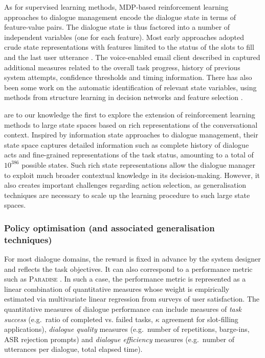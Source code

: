 As for supervised learning methods, MDP-based reinforcement learning approaches to dialogue management encode the dialogue state in terms of feature-value pairs.  The dialogue state is thus factored into a number of independent variables (one for each feature).  Most early approaches adopted crude state representations with features limited to the status of the slots to fill and the last user utterance \citep{817450,Singh:2000:EER:647288.723412,Scheffler:2002}.  The voice-enabled email client described in \cite{Walker:2000} captured additional measures related to the overall task progress, history of previous system attempts, confidence thresholds and timing information.  There has also been some work on the automatic identification of relevant state variables, using methods from structure learning in decision networks \citep{PaekC06} and feature selection \citep{tetreault2006using}. 

\cite{Henderson:2008} are to our knowledge the first to explore the extension of reinforcement learning methods to large state spaces based on rich representations of the conversational context. Inspired by information state approaches to dialogue management, their state space captures detailed information such as complete history of dialogue acts and fine-grained representations of the task status, amounting to a total of $10^{386}$ possible states.  Such rich state representations allow the dialogue manager to exploit much broader contextual knowledge in its decision-making.  However, it also creates important challenges regarding action selection, as generalisation techniques are necessary to scale up the learning procedure to such large state spaces.

\subsubsection{Policy optimisation (and associated generalisation techniques)}

For most dialogue domains, the reward is fixed in advance by the system designer and reflects the task objectives.  It can also correspond to a performance metric such as \textsc{Paradise} \citep{Walker:2000}.  In such a case, the performance metric is represented as a linear combination of quantitative measures whose weight is empirically estimated via multivariate linear regression from surveys of user satisfaction.  The quantitative measures of dialogue performance can include measures of \textit{task success} (e.g.\ ratio of completed vs. failed tasks, $\kappa$ agreement for slot-filling applications), \textit{dialogue quality} measures (e.g.\ number of repetitions, barge-ins, ASR rejection prompts) and \textit{dialogue efficiency} measures (e.g.\ number of utterances per dialogue, total elapsed time).

